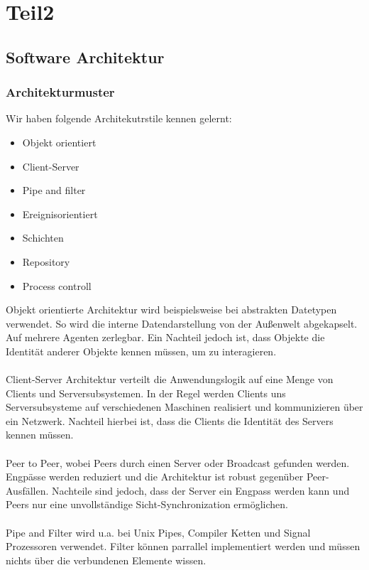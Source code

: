 \newpage
\section{Teil2}

\subsection{Software Architektur}

\subsubsection{Architekturmuster}

Wir haben folgende Architekutrstile kennen gelernt:\\
\begin{itemize}
    \item Objekt orientiert
    \item Client-Server
    \item Pipe and filter
    \item Ereignisorientiert
    \item Schichten
    \item Repository
    \item Process controll
\end{itemize}
Objekt orientierte Architektur wird beispielsweise bei abstrakten Datetypen verwendet.
So wird die interne Datendarstellung von der Außenwelt abgekapselt.
Auf mehrere Agenten zerlegbar.
Ein Nachteil jedoch ist, dass Objekte die Identität anderer Objekte kennen müssen, um zu interagieren.
\\ \\
Client-Server Architektur verteilt die Anwendungslogik auf eine Menge von Clients und Serversubsystemen.
In der Regel werden Clients uns Serversubsysteme auf verschiedenen Maschinen realisiert und kommunizieren über ein
Netzwerk.
Nachteil hierbei ist, dass die Clients die Identität des Servers kennen müssen.
\\ \\
Peer to Peer, wobei Peers durch einen Server oder Broadcast gefunden werden.
Engpässe werden reduziert und die Architektur ist robust gegenüber Peer-Ausfällen.
Nachteile sind jedoch, dass der Server ein Engpass werden kann und Peers nur eine unvollständige Sicht-Synchronization 
ermöglichen.
\\ \\
Pipe and Filter wird u.a. bei Unix Pipes, Compiler Ketten und Signal Prozessoren verwendet.
Filter können parrallel implementiert werden und müssen nichts über die verbundenen Elemente wissen.
